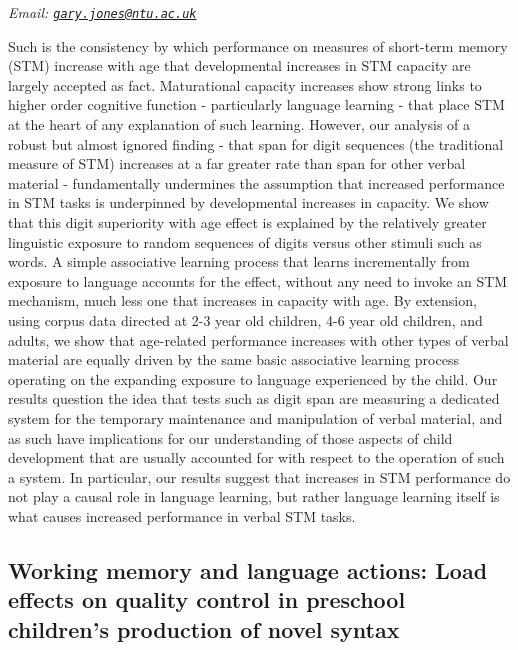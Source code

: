 \documentclass[
  12pt,
]{book}
\begin{document}
\emph{Email: \href{mailto:gary.jones@ntu.ac.uk}{\nolinkurl{gary.jones@ntu.ac.uk}}}

Such is the consistency by which performance on measures of short-term memory (STM) increase with age that developmental increases in STM capacity are largely accepted as fact. Maturational capacity increases show strong links to higher order cognitive function - particularly language learning - that place STM at the heart of any explanation of such learning. However, our analysis of a robust but almost ignored finding - that span for digit sequences (the traditional measure of STM) increases at a far greater rate than span for other verbal material - fundamentally undermines the assumption that increased performance in STM tasks is underpinned by developmental increases in capacity. We show that this digit superiority with age effect is explained by the relatively greater linguistic exposure to random sequences of digits versus other stimuli such as words. A simple associative learning process that learns incrementally from exposure to language accounts for the effect, without any need to invoke an STM mechanism, much less one that increases in capacity with age. By extension, using corpus data directed at 2-3 year old children, 4-6 year old children, and adults, we show that age-related performance increases with other types of verbal material are equally driven by the same basic associative learning process operating on the expanding exposure to language experienced by the child. Our results question the idea that tests such as digit span are measuring a dedicated system for the temporary maintenance and manipulation of verbal material, and as such have implications for our understanding of those aspects of child development that are usually accounted for with respect to the operation of such a system. In particular, our results suggest that increases in STM performance do not play a causal role in language learning, but rather language learning itself is what causes increased performance in verbal STM tasks.

\hypertarget{working-memory-and-language-actions-load-effects-on-quality-control-in-preschool-childrens-production-of-novel-syntax}{%
\subsection{Working memory and language actions: Load effects on quality control in preschool children's production of novel syntax}\label{working-memory-and-language-actions-load-effects-on-quality-control-in-preschool-childrens-production-of-novel-syntax}}
\end{document}
